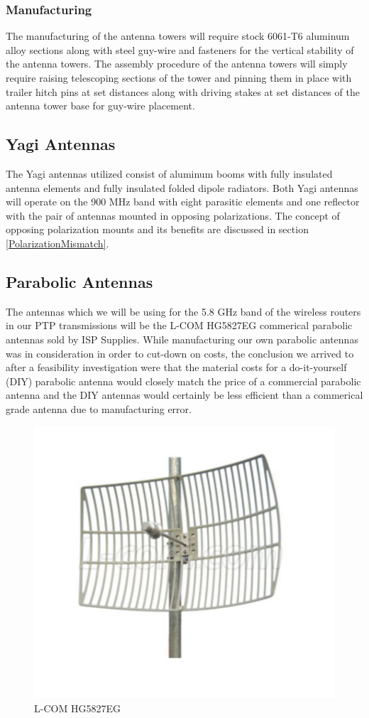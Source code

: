 \documentclass[10pt,a4paper]{article}
\begin{document}
\subsubsection{Manufacturing}
The manufacturing of the antenna towers will require stock 6061-T6 aluminum alloy sections along with steel guy-wire and fasteners for the vertical stability of the antenna towers. The assembly procedure of the antenna towers will simply require raising telescoping sections of the tower and pinning them in place with trailer hitch pins at set distances along with driving stakes at set distances of the antenna tower base for guy-wire placement.



\subsection{Yagi Antennas}
The Yagi antennas utilized consist of aluminum booms with fully insulated antenna elements and fully insulated folded dipole radiators. Both Yagi antennas will operate on the 900 MHz band with eight parasitic elements and one reflector with the pair of antennas mounted in opposing polarizations. The concept of opposing polarization mounts and its benefits are discussed in section \ref{PolarizationMismatch}.



\subsection{Parabolic Antennas}
The antennas which we will be using for the 5.8 GHz band of the wireless routers in our PTP transmissions will be the L-COM HG5827EG commerical parabolic antennas sold by ISP Supplies. While manufacturing our own parabolic antennas was in consideration in order to cut-down on costs, the conclusion we arrived to after a feasibility investigation were that the material costs for a do-it-yourself (DIY) parabolic antenna would closely match the price of a commercial parabolic antenna and the DIY antennas would certainly be less efficient than a commerical grade antenna due to manufacturing error.
\begin{figure}[h!]
	\centering
	\includegraphics[width=.75\textwidth]{./figs/ParabolicAntenna.jpg}
	\caption{L-COM HG5827EG}
	\label{fig:example}
\end{figure}
\end{document}
